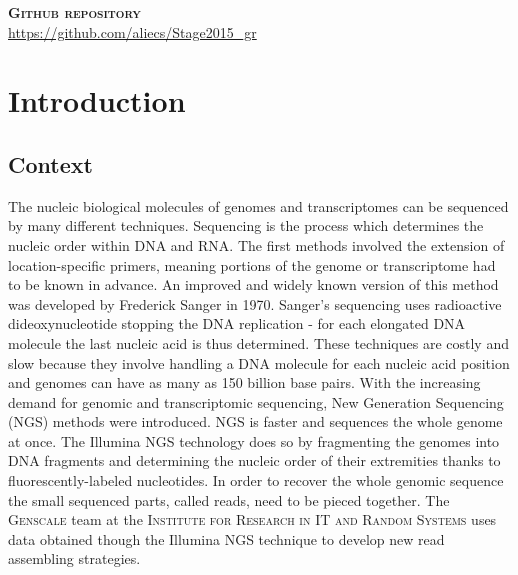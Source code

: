 \documentclass[12pt]{article}
\begin{document}
\vspace{2cm}
\textbf{\textsc{Github repository}}\\
\hspace*{1cm} \url{https://github.com/aliecs/Stage2015_gr}








\thispagestyle{empty}
\clearpage
\hypersetup{linkcolor=gray}
\tableofcontents
\thispagestyle{empty}
\newpage
\section{Introduction}
\setcounter{page}{1}
\subsection{Context}
The nucleic biological molecules of genomes and transcriptomes can be sequenced by many different techniques. Sequencing is the process which determines the nucleic order within DNA and RNA. The first methods involved the extension of location-specific primers, meaning portions of the genome or transcriptome had to be known in advance. An improved and widely known version of this method was developed by Frederick Sanger in 1970. Sanger's sequencing \citep{sanger_dna_1977} uses radioactive dideoxynucleotide stopping the DNA replication - for each elongated DNA molecule the last nucleic acid is thus determined. These techniques are costly and slow because they involve handling a DNA molecule for each nucleic acid position and genomes can have as many as 150 billion base pairs. With the increasing demand for genomic and transcriptomic sequencing, New Generation Sequencing (NGS) methods were introduced. NGS is faster and sequences the whole genome at once. The Illumina NGS technology does so by fragmenting the genomes into DNA fragments and determining the nucleic order of their extremities thanks to fluorescently-labeled nucleotides. In order to recover the whole genomic sequence the small sequenced parts, called reads, need to be pieced together. The \textsc{Genscale} team at the \textsc{Institute for Research in IT and Random Systems} uses data obtained though the Illumina NGS technique to develop new read assembling strategies.
\end{document}
